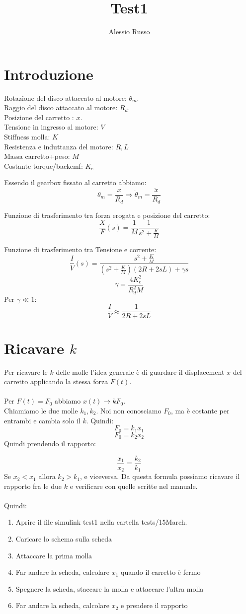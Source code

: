 \documentclass[10pt,a4paper]{article}
\author{Alessio Russo}
\title{Test1}
\begin{document}
\tableofcontents

\section{Introduzione}
Rotazione del disco attaccato al motore: $\theta_m$. \\
Raggio del disco attaccato al motore: $R_d$. \\
Posizione del carretto : $x$. \\
Tensione in ingresso al motore: $V$ \\
Stiffness molla: $K$ \\
Resistenza e induttanza del motore: $R,L$ \\
Massa carretto+peso: $M$ \\
Costante torque/backemf: $K_e$

Essendo il gearbox fissato al carretto abbiamo:
$$\theta_m = \frac{x}{R_d} \Rightarrow \dot{\theta}_m = \frac{\ddot{x}}{R_d}$$

Funzione di trasferimento tra forza erogata e posizione del carretto:
$$\frac{X}{F}(s) = \frac{1}{M} \frac{1}{s^2+\frac{K}{M}}$$

Funzione di trasferimento tra Tensione e corrente:
$$\frac{I}{V}(s) = \frac{s^2+\frac{K}{M}}{(s^2+\frac{K}{M})(2R+2sL)+\gamma s}$$
$$\gamma = \frac{4K_e^2}{R_d^2M}$$
Per $\gamma \ll 1$:
$$\frac{I}{V} \approx \frac{1}{2R+2sL}$$
\newpage
\section{Ricavare $k$}
Per ricavare le $k$ delle molle l'idea generale è di guardare il displacement $x$ del carretto applicando la stessa forza $F(t)$. \\ \\
Per $F(t)=F_0$ abbiamo $x(t) \to kF_0$. \\
Chiamiamo le due molle $k_1,k_2$. Noi non conosciamo $F_0$, ma è costante per entrambi e cambia solo il $k$. Quindi:
$$F_0 = k_1 x_1$$
$$F_0 = k_2 x_2$$
Quindi prendendo il rapporto:

$$\frac{x_1}{x_2} = \frac{k_2}{k_1}$$
Se $x_2 < x_1$ allora $k_2 > k_1$, e viceversa.  Da questa formula possiamo ricavare il rapporto fra le due $k$ e verificare con quelle scritte nel manuale. \\ \\
Quindi:
\begin{enumerate}
\item Aprire il file simulink test1 nella cartella tests/15March.
\item Caricare lo schema sulla scheda
\item Attaccare la prima molla
\item Far andare la scheda, calcolare $x_1$ quando il carretto è fermo
\item Spegnere la scheda, staccare la molla e attaccare l'altra molla
\item Far andare la scheda, calcolare $x_2$ e prendere il rapporto
\end{enumerate}
\newpage
\end{document}
